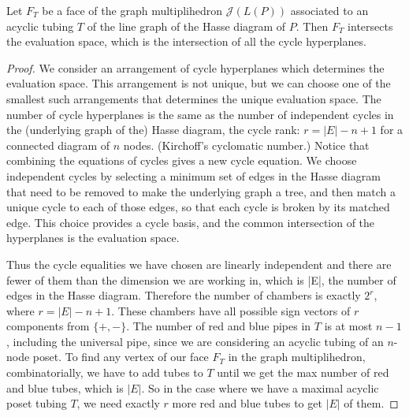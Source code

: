 \documentclass[10pt,a4paper]{amsart}
\begin{document}
 \begin{lemma}
     Let $F_T$ be a face of the graph multiplihedron $\mathcal{J}(L(P))$ associated to an acyclic tubing $T$ of the line graph of the Hasse diagram of $P$. Then $F_T$ intersects the evaluation space, which is the intersection of all the cycle hyperplanes.
 \end{lemma}       

   \begin{proof}
       We consider an arrangement of cycle hyperplanes which determines the evaluation space. This arrangement is not unique, but we can choose one of the smallest such arrangements that determines the unique evaluation space.  
       The number of cycle hyperplanes is the same as the number of independent cycles in the (underlying graph of the) Hasse diagram, the cycle rank: $r = |E| - n +1$ for a connected diagram of $n$ nodes. (Kirchoff's cyclomatic number.) Notice that combining the equations of cycles gives a new cycle equation. We choose independent cycles by selecting a minimum set of edges in the Hasse diagram that need to be removed to make the underlying graph a tree, and then match a unique cycle to each of those edges, so that each cycle is broken by its matched edge. This choice provides a cycle basis, and the common intersection of the hyperplanes is the evaluation space. %


 
Thus the cycle equalities we have chosen are linearly independent and there are fewer of them than the dimension we are working in, which is |E|, the number of edges in the Hasse diagram. Therefore the number of chambers is exactly $2^r$,  where $r =|E|-n+1$.  These chambers have all possible sign vectors of $r$ components from $\{+,-\}$. 
The number of red and blue pipes in $T$ is at most $n-1$, including the universal pipe, since we are considering an acyclic tubing of an $n$-node poset. To find any vertex of our face $F_T$ in the graph multiplihedron, combinatorially, we have to add tubes to $T$ until we get the max number of red and blue tubes, which is $|E|$. 
So in the case where we have a maximal acyclic poset tubing $T$, we need exactly $r$ more red and blue tubes to get $|E|$ of them. 


\end{proof}
\end{document}
